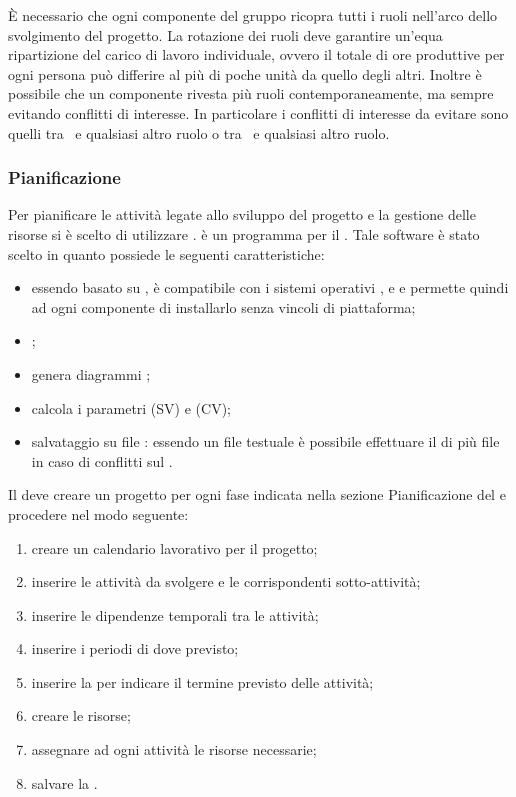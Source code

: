 \documentclass[12pt,a4paper]{article}
\begin{document}
È necessario che ogni componente del gruppo ricopra tutti i ruoli nell'arco dello svolgimento del progetto. La rotazione dei ruoli deve garantire un'equa ripartizione del carico di lavoro individuale, ovvero il totale di ore produttive per ogni persona può differire al più di poche unità da quello degli altri. Inoltre è possibile che un componente rivesta più ruoli contemporaneamente, ma sempre evitando conflitti di interesse. In particolare i conflitti di interesse da evitare sono quelli tra \PM\ e qualsiasi altro ruolo o tra \VR\ e qualsiasi altro ruolo.

\subsubsection{Pianificazione}
Per pianificare le attività legate allo sviluppo del progetto e la gestione delle risorse si è scelto di utilizzare .
 è un programma  per il . Tale software è stato scelto in quanto possiede le seguenti caratteristiche:
\begin{itemize}
	\item  essendo basato su , è compatibile con i sistemi operativi , e  e permette quindi ad ogni componente di installarlo senza vincoli di piattaforma; 
	\item {};
	\item genera diagrammi ;
	\item calcola i parametri  (SV) e  (CV);
	\item salvataggio su file : essendo un file testuale è possibile effettuare il  di più file in caso di conflitti sul .
\end{itemize}

\label{projeclibre}
Il \PM deve creare un progetto per ogni fase indicata nella sezione Pianificazione del \PdP{} e procedere nel modo seguente:
\begin{enumerate}
	\item creare un calendario lavorativo per il progetto;
	\item inserire le attività da svolgere e le corrispondenti sotto-attività;
	\item inserire le dipendenze temporali tra le attività;
	\item inserire i periodi di  dove previsto;
	\item inserire la  per indicare il termine previsto delle attività;
	\item creare le risorse;
	\item assegnare ad ogni attività le risorse necessarie;
	\item salvare la .
\end{enumerate}
\end{document}
